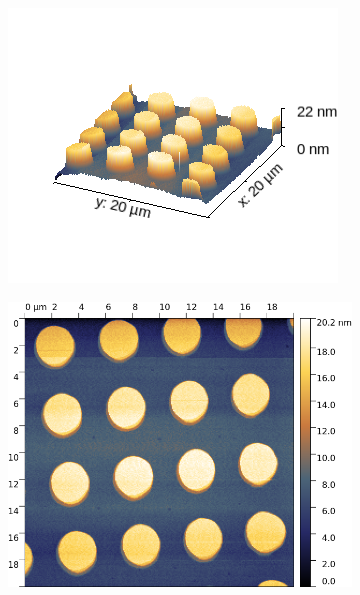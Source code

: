 \begin{figure}[H]
\begin{subfigure}{0.49\textwidth}
        \includegraphics[width=\textwidth]{bilder/Mikrostruktur/Kreis_Vor_3D.png}
        \caption{}
    \end{subfigure}
    \begin{subfigure}{0.49\textwidth}
        \includegraphics[width=\textwidth]{bilder/Mikrostruktur/Kreis_Bac_2D.png}
        \caption{}
    \end{subfigure}
    \begin{subfigure}{0.49\textwidth}

\end{subfigure}
\end{figure}
